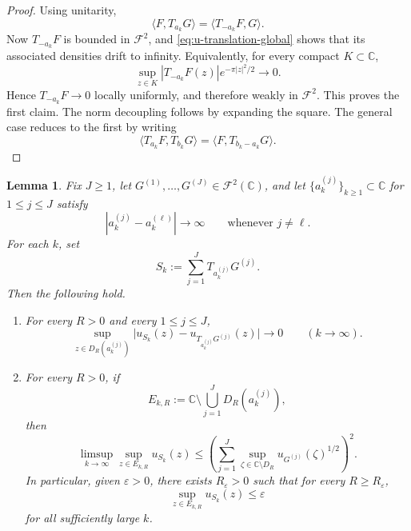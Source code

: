 \documentclass[a4paper,11pt,reqno]{amsart}
\numberwithin{equation}{section}
\theoremstyle{plain} %
\newtheorem{lemma}{Lemma}[section]
\theoremstyle{definition} %
\theoremstyle{remark}
\newcommand{\C}{\mathbb{C}}
\begin{document}
\begin{proof}
Using unitarity,
\[
\langle F,T_{a_k}G\rangle
=
\langle T_{-a_k}F,G\rangle.
\]
Now \(T_{-a_k}F\) is bounded in \(\mathcal F^2\), and
\eqref{eq:u-translation-global} shows that its associated densities drift to
infinity. Equivalently, for every compact \(K\subset \C\),
\[
\sup_{z\in K}|T_{-a_k}F(z)|e^{-\pi |z|^2/2}\to 0.
\]
Hence \(T_{-a_k}F\to 0\) locally uniformly, and therefore weakly in
\(\mathcal F^2\). This proves the first claim. The norm decoupling follows by
expanding the square. The general case reduces to the first by writing
\[
\langle T_{a_k}F,T_{b_k}G\rangle
=
\langle F,T_{b_k-a_k}G\rangle.
\]
\end{proof}

\begin{lemma}\label{lem:pointwise-decoupling-global}
Fix \(J\ge 1\), let \(G^{(1)},\dots,G^{(J)}\in \mathcal F^2(\C)\), and let
\(\{a_k^{(j)}\}_{k\ge 1}\subset \C\) for \(1\le j\le J\) satisfy
\[
|a_k^{(j)}-a_k^{(\ell)}|\to\infty
\qquad\text{whenever }j\neq \ell.
\]
For each \(k\), set
\[
S_k:=\sum_{j=1}^J T_{a_k^{(j)}}G^{(j)}.
\]
Then the following hold.
\begin{enumerate}
\item[(i)] For every \(R>0\) and every \(1\le j\le J\),
\[
\sup_{z\in D_R(a_k^{(j)})}
\big|u_{S_k}(z)-u_{T_{a_k^{(j)}}G^{(j)}}(z)\big|
\to 0
\qquad (k\to\infty).
\]

\item[(ii)] For every \(R>0\), if
\[
E_{k,R}:=\C\setminus \bigcup_{j=1}^J D_R(a_k^{(j)}),
\]
then
\[
\limsup_{k\to\infty}\sup_{z\in E_{k,R}}u_{S_k}(z)
\le
\left(
\sum_{j=1}^J
\sup_{\zeta\in \C\setminus D_R} u_{G^{(j)}}(\zeta)^{1/2}
\right)^2.
\]
In particular, given \(\varepsilon>0\), there exists \(R_\varepsilon>0\) such that
for every \(R\ge R_\varepsilon\),
\[
\sup_{z\in E_{k,R}}u_{S_k}(z)\le \varepsilon
\]
for all sufficiently large \(k\).
\end{enumerate}
\end{lemma}
\end{document}
